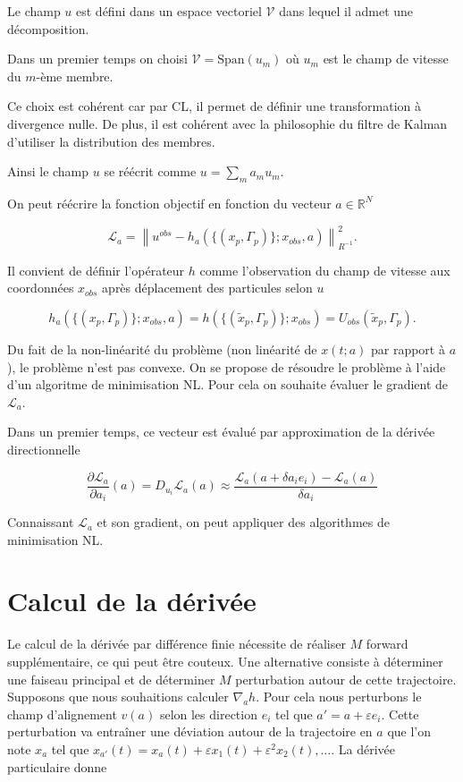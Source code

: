 \documentclass{article}
\newcommand{\norm}[1]{\left\lVert #1 \right\rVert}
\begin{document}
Le champ $u$ est défini dans un espace vectoriel $\mathcal{V}$ dans lequel il admet une décomposition.

Dans un premier temps on choisi $\mathcal{V} = \text{Span}(u_m)$ où $u_m$ est le champ de vitesse du $m$-ème membre.

Ce choix est cohérent car par CL, il permet de définir une transformation à divergence nulle.
De plus, il est cohérent avec la philosophie du filtre de Kalman d'utiliser la distribution des membres.

Ainsi le champ $u$ se réécrit comme $u = \sum_m a_m u_m$.

On peut réécrire la fonction objectif en fonction du vecteur $a \in \mathbb{R}^N$

\begin{equation*}
    \mathcal L_a =  \norm{u^{obs} - h_a(\{(x_p, \Gamma_p)\}; x_{obs}, a)}^2_{R^{-1}}.
\end{equation*}

Il convient de définir l'opérateur $h$ comme l'observation du champ de vitesse aux coordonnées $x_{obs}$ après déplacement des particules selon $u$

\begin{equation*}
    h_a(\{(x_p, \Gamma_p)\}; x_{obs}, a) = h(\{(\tilde x_p, \Gamma_p)\}; x_{obs}) = U_{obs}(\tilde x_p, \Gamma_p).
\end{equation*}

Du fait de la non-linéarité du problème (non linéarité de $x(t;a)$ par rapport à $a$), le problème n'est pas convexe. On se propose de résoudre le problème à l'aide d'un algoritme de minimisation NL. Pour cela on souhaite évaluer le gradient de $\mathcal L_a$.

Dans un premier temps, ce vecteur est évalué par approximation de la dérivée directionnelle

\begin{equation*}
    \frac{\partial \mathcal L_a}{\partial a_i}(a) = D_{u_i} \mathcal L_a(a) \approx \frac{\mathcal L_a(a + \delta a_i e_i) - \mathcal L_a(a)}{\delta a_i}
\end{equation*}

Connaissant $\mathcal L_a$ et son gradient, on peut appliquer des algorithmes de minimisation NL.

\section{Calcul de la dérivée}

Le calcul de la dérivée par différence finie nécessite de réaliser $M$ forward supplémentaire, ce qui peut être couteux. Une alternative consiste à déterminer une faiseau principal et de déterminer $M$ perturbation autour de cette trajectoire. Supposons que nous souhaitions calculer $\nabla_a h$. Pour cela nous perturbons le champ d'alignement $v(a)$ selon les direction $e_i$ tel que $a' = a + \varepsilon e_i$. Cette perturbation va entraîner une déviation autour de la trajectoire en $a$ que l'on note $x_a$ tel que $x_{a'}(t) = x_a(t) + \varepsilon x_1(t) + \varepsilon^2 x_2(t), \dots$.
La dérivée particulaire donne
\end{document}
